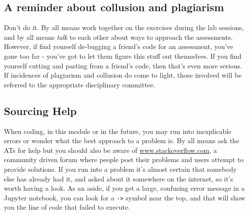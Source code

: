 

\subsection{A reminder about collusion and plagiarism}
\label{subsec:collusion}
Don't do it. By all means work together on the exercises during the lab sessions, and by all means {\it talk} to each other about ways to approach the assessments. However, if find yourself de-bugging a friend's code for an assessment, you've gone too far -  you've got to let them figure this stuff out themselves. If you find yourself cutting and pasting from a friend's code, then that's even more serious. If incidences of plagiarism and collusion do come to light, those involved will be referred to the appropriate disciplinary committee. 

\subsection{Sourcing Help}
When coding, in this module or in the future, you may run into inexplicable errors or wonder what the best approach to a problem is. By all means ask the ATs for help but you should also be aware of \url{www.stackoverflow.com}, a community driven forum where people post their problems and users attempt to provide solutions. If you run into a problem it's almost certain that somebody else has already had it, and asked about it somewhere on the internet, so it's worth having a look.
As an aside, if you get a large, confusing error message in a Jupyter notebook, you can look for a \texttt{->} symbol near the top, and that will show you the line of code that failed to execute.

